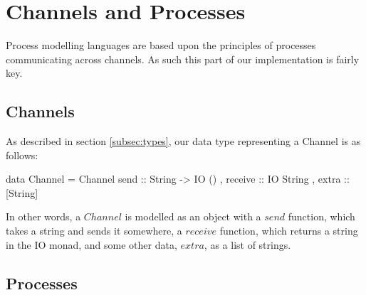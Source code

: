\section{Channels and Processes}
\label{sec:channels}

Process modelling languages are based upon the principles of processes communicating across channels. As such this part of our implementation is fairly key. 

\subsection{Channels}

As described in section \ref{subsec:types}, our data type representing a Channel is as follows:

\begin{code}
data Channel = Channel {
               send         :: String -> IO ()
             , receive      :: IO String
             , extra        :: [String]
             }
\end{code}

In other words, a $Channel$ is modelled as an object with a $send$ function, which takes a string and sends it somewhere, a $receive$ function, which returns a string in the IO monad, and some other data, $extra$, as a list of strings.

\subsection{Processes}

